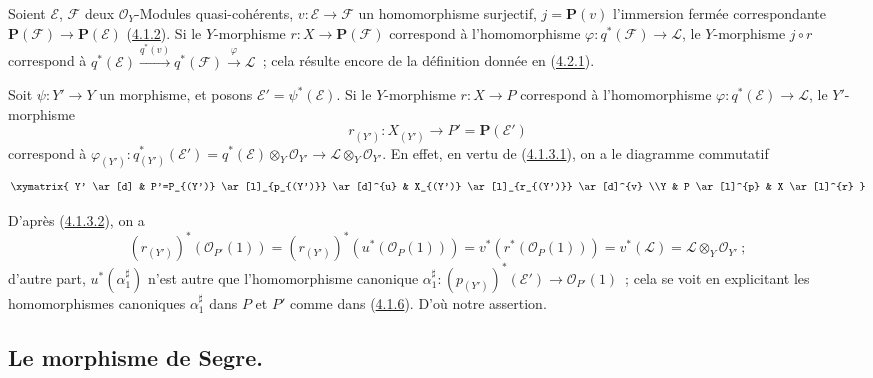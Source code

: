 \begin{env}[4.2.9]
\label{II.4.2.9-fr}
Soient $\mathcal{E}$, $\mathcal{F}$ deux $\mathcal{O}_Y$-Modules
quasi-cohérents, $v:\mathcal{E}\to\mathcal{F}$ un homomorphisme surjectif,
$j=\mathbf{P}(v)$ l'immersion fermée correspondante
$\mathbf{P}(\mathcal{F})\to\mathbf{P}(\mathcal{E})$
(\hyperref[II.4.1.2-fr]{4.1.2}). Si le $Y$-morphisme
$r:X\to\mathbf{P}(\mathcal{F})$ correspond à l'homomorphisme
$\varphi:q^*(\mathcal{F})\to\mathcal{L}$, le
$Y$-morphisme $j\circ r$ correspond à
$q^*(\mathcal{E})\xrightarrow{q^*(v)}q^*(\mathcal{F})
\xrightarrow{\varphi}\mathcal{L}$~;
cela résulte encore de la définition donnée en
(\hyperref[II.4.2.1-fr]{4.2.1}).
\end{env}

\begin{env}[4.2.10]
\label{II.4.2.10-fr}
Soit $\psi:Y'\to Y$ un morphisme, et posons
$\mathcal{E}'=\psi^*(\mathcal{E})$. Si le $Y$-morphisme $r:X\to P$ correspond
à l'homomorphisme $\varphi:q^*(\mathcal{E})\to\mathcal{L}$, le
$Y'$-morphisme
\[
  r_{(Y')}:X_{(Y')}\longrightarrow P'=\mathbf{P}(\mathcal{E}')
\]
correspond à
$\varphi_{(Y')}:q_{(Y')}^*(\mathcal{E}')=
  q^*(\mathcal{E})\otimes_Y\mathcal{O}_{Y'}\to
\mathcal{L}\otimes_Y\mathcal{O}_{Y'}$. En effet, en vertu de
(\hyperref[II.4.1.3.1-fr]{4.1.3.1}), on a le diagramme commutatif
\[
  \xymatrix{
    Y' \ar[d]
    & P'=P_{(Y')} \ar[l]_{p_{(Y')}} \ar[d]^{u}
    & X_{(Y')} \ar[l]_{r_{(Y')}} \ar[d]^{v}
    \\Y
    & P \ar[l]^{p}
    & X \ar[l]^{r}
  }
\]

D'après (\hyperref[II.4.1.3.2-fr]{4.1.3.2}), on a
\[
  (r_{(Y')})^*(\mathcal{O}_{P'}(1))
  =(r_{(Y')})^*(u^*(\mathcal{O}_P(1)))
  =v^*(r^*(\mathcal{O}_P(1)))
  =v^*(\mathcal{L})=\mathcal{L}\otimes_Y\mathcal{O}_{Y'}~;
\]
d'autre part, $u^*(\alpha_1^\sharp)$ n'est autre que l'homomorphisme
canonique
$\alpha_1^\sharp:(p_{(Y')})^*(\mathcal{E}')\to\mathcal{O}_{P'}(1)$~; cela
se voit en explicitant les homomorphismes canoniques $\alpha_1^\sharp$ dans
$P$ et $P'$ comme dans (\hyperref[II.4.1.6-fr]{4.1.6}). D'où notre assertion.
\end{env}

\subsection{Le morphisme de Segre.}
\label{subsection:II.4.3-fr}


